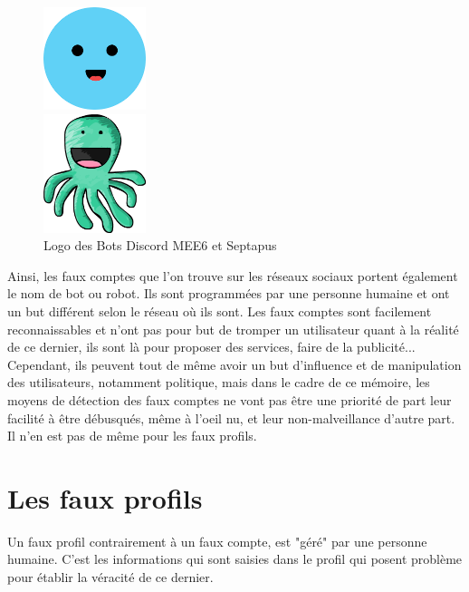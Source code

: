 \documentclass[12pt]{report}
\begin{document}
\begin{figure}[h]
    \begin{center}
    \includegraphics[width=30mm]{Mee6Discord.png}
    \end{center}
    \begin{center}
    \includegraphics[width=30mm]{SeptapusDiscord.png}
    \end{center}
    \caption{Logo des Bots Discord MEE6 et Septapus}
\label{fig:Logo des Bots Discord MEE6 et Septapus}
  \end{figure}

Ainsi, les faux comptes que l'on trouve sur les réseaux sociaux portent également le nom de bot ou robot. Ils sont programmées par une personne humaine et ont un but différent selon le réseau où ils sont. Les faux comptes sont facilement reconnaissables et n'ont pas pour but de tromper un utilisateur quant à la réalité de ce dernier, ils sont là pour proposer des services, faire de la publicité... \\
Cependant, ils peuvent tout de même avoir un but d'influence et de manipulation des utilisateurs, notamment politique, mais dans le cadre de ce mémoire, les moyens de détection des faux comptes ne vont pas être une priorité de part leur facilité à être débusqués, même à l'oeil nu, et leur non-malveillance d'autre part. Il n'en est pas de même pour les faux profils.

\section{Les faux profils}
Un faux profil contrairement à un faux compte, est "géré" par une personne humaine. C'est les informations qui sont saisies dans le profil qui posent problème pour établir la véracité de ce dernier.
\end{document}
